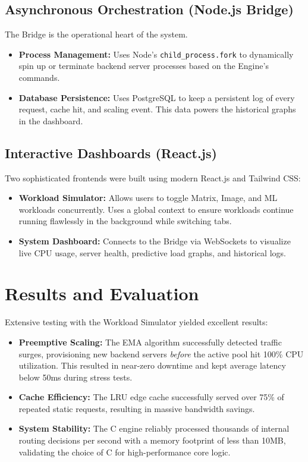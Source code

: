 \documentclass[12pt]{article}
\begin{document}
\subsection{Asynchronous Orchestration (Node.js Bridge)}
The Bridge is the operational heart of the system.
\begin{itemize}
    \item \textbf{Process Management:} Uses Node's \texttt{child\_process.fork} to dynamically spin up or terminate backend server processes based on the Engine's commands.
    \item \textbf{Database Persistence:} Uses PostgreSQL to keep a persistent log of every request, cache hit, and scaling event. This data powers the historical graphs in the dashboard.
\end{itemize}

\subsection{Interactive Dashboards (React.js)}
Two sophisticated frontends were built using modern React.js and Tailwind CSS:
\begin{itemize}
    \item \textbf{Workload Simulator:} Allows users to toggle Matrix, Image, and ML workloads concurrently. Uses a global context to ensure workloads continue running flawlessly in the background while switching tabs.
    \item \textbf{System Dashboard:} Connects to the Bridge via WebSockets to visualize live CPU usage, server health, predictive load graphs, and historical logs.
\end{itemize}

\section{Results and Evaluation}
Extensive testing with the Workload Simulator yielded excellent results:
\begin{itemize}
    \item \textbf{Preemptive Scaling:} The EMA algorithm successfully detected traffic surges, provisioning new backend servers \textit{before} the active pool hit 100\% CPU utilization. This resulted in near-zero downtime and kept average latency below 50ms during stress tests.
    \item \textbf{Cache Efficiency:} The LRU edge cache successfully served over 75\% of repeated static requests, resulting in massive bandwidth savings.
    \item \textbf{System Stability:} The C engine reliably processed thousands of internal routing decisions per second with a memory footprint of less than 10MB, validating the choice of C for high-performance core logic.
\end{itemize}
\end{document}
